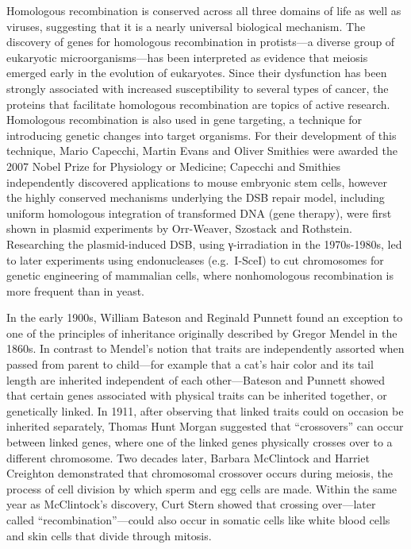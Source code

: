 Homologous recombination is conserved across all three domains of life as well as viruses, suggesting that it is a nearly universal biological mechanism. The discovery of genes for homologous recombination in protists---a diverse group of eukaryotic microorganisms---has been interpreted as evidence that meiosis emerged early in the evolution of eukaryotes. Since their dysfunction has been strongly associated with increased susceptibility to several types of cancer, the proteins that facilitate homologous recombination are topics of active research. Homologous recombination is also used in gene targeting, a technique for introducing genetic changes into target organisms. For their development of this technique, Mario Capecchi, Martin Evans and Oliver Smithies were awarded the 2007 Nobel Prize for Physiology or Medicine; Capecchi and Smithies independently discovered applications to mouse embryonic stem cells, however the highly conserved mechanisms underlying the DSB repair model, including uniform homologous integration of transformed DNA (gene therapy), were first shown in plasmid experiments by Orr-Weaver, Szostack and Rothstein. Researching the plasmid-induced DSB, using γ-irradiation in the 1970s-1980s, led to later experiments using endonucleases (e.g.~I-SceI) to cut chromosomes for genetic engineering of mammalian cells, where nonhomologous recombination is more frequent than in yeast.

In the early 1900s, William Bateson and Reginald Punnett found an exception to one of the principles of inheritance originally described by Gregor Mendel in the 1860s. In contrast to Mendel's notion that traits are independently assorted when passed from parent to child---for example that a cat's hair color and its tail length are inherited independent of each other---Bateson and Punnett showed that certain genes associated with physical traits can be inherited together, or genetically linked. In 1911, after observing that linked traits could on occasion be inherited separately, Thomas Hunt Morgan suggested that ``crossovers'' can occur between linked genes, where one of the linked genes physically crosses over to a different chromosome. Two decades later, Barbara McClintock and Harriet Creighton demonstrated that chromosomal crossover occurs during meiosis, the process of cell division by which sperm and egg cells are made. Within the same year as McClintock's discovery, Curt Stern showed that crossing over---later called ``recombination''---could also occur in somatic cells like white blood cells and skin cells that divide through mitosis.

